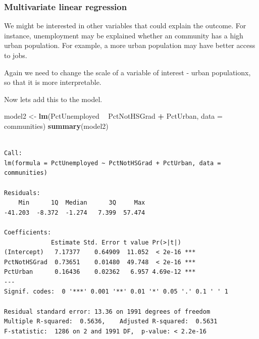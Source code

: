 \documentclass[]{article}
\newenvironment{Shaded}{\begin{snugshade}}{\end{snugshade}}
\newcommand{\DataTypeTok}[1]{\textcolor[rgb]{0.13,0.29,0.53}{#1}}
\newcommand{\DecValTok}[1]{\textcolor[rgb]{0.00,0.00,0.81}{#1}}
\newcommand{\KeywordTok}[1]{\textcolor[rgb]{0.13,0.29,0.53}{\textbf{#1}}}
\newcommand{\NormalTok}[1]{#1}
\newcommand{\OperatorTok}[1]{\textcolor[rgb]{0.81,0.36,0.00}{\textbf{#1}}}
\newcommand{\StringTok}[1]{\textcolor[rgb]{0.31,0.60,0.02}{#1}}
\begin{document}
\hypertarget{multivariate-linear-regression}{%
\subsubsection{Multivariate linear regression}\label{multivariate-linear-regression}}

We might be interested in other variables that could explain the outcome. For instance, unemployment may be explained whether an community has a high urban population. For example, a more urban population may have better access to jobs.

Again we need to change the scale of a variable of interest - urban populationx, so that it is more interpretable.

\begin{Shaded}
\end{Shaded}

Now lets add this to the model.

\begin{Shaded}
\begin{Highlighting}[]
\NormalTok{model2 <-}\StringTok{ }\KeywordTok{lm}\NormalTok{(PctUnemployed }\OperatorTok{~}\StringTok{ }\NormalTok{PctNotHSGrad }\OperatorTok{+}\StringTok{ }\NormalTok{PctUrban, }\DataTypeTok{data =}\NormalTok{ communities)}
\KeywordTok{summary}\NormalTok{(model2)}
\end{Highlighting}
\end{Shaded}

\begin{verbatim}

Call:
lm(formula = PctUnemployed ~ PctNotHSGrad + PctUrban, data = communities)

Residuals:
    Min      1Q  Median      3Q     Max 
-41.203  -8.372  -1.274   7.399  57.474 

Coefficients:
             Estimate Std. Error t value Pr(>|t|)    
(Intercept)   7.17377    0.64909  11.052  < 2e-16 ***
PctNotHSGrad  0.73651    0.01480  49.748  < 2e-16 ***
PctUrban      0.16436    0.02362   6.957 4.69e-12 ***
---
Signif. codes:  0 '***' 0.001 '**' 0.01 '*' 0.05 '.' 0.1 ' ' 1

Residual standard error: 13.36 on 1991 degrees of freedom
Multiple R-squared:  0.5636,    Adjusted R-squared:  0.5631 
F-statistic:  1286 on 2 and 1991 DF,  p-value: < 2.2e-16
\end{verbatim}
\end{document}
